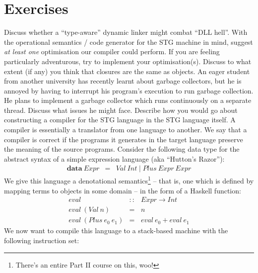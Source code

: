 \documentclass[10pt,a4paper]{exam} %
\begin{document}
\section*{Exercises}

\begin{questions}
\question Discuss whether a ``type-aware'' dynamic linker might combat ``DLL hell''.
\question With the operational semantics / code generator for the STG machine in mind, suggest \emph{at least one} optimisation our compiler could perform. If you are feeling particularly adventurous, try to implement your optimisation(s).
\question Discuss to what extent (if any) you think that closures are the same as objects. 
\question An eager student from another university has recently learnt about garbage collectors, but he is annoyed by having to interrupt his program's execution to run garbage collection. He plans to implement a garbage collector which runs continuously on a separate thread. Discuss what issues he might face.
\question Describe how you would go about constructing a compiler for the STG language in the STG language itself.
\question A compiler is essentially a translator from one language to another. We say that a compiler is correct if the programs it generates in the target language preserve the meaning of the source programs. Consider the following data type for the abstract syntax of a simple expression language (aka ``Hutton's Razor''):
\begin{displaymath}
\begin{array}{lcl}
\mathbf{data}~\mathit{Expr} & = & \mathit{Val}~\mathit{Int} \mid \mathit{Plus}~\mathit{Expr}~\mathit{Expr}
\end{array}
\end{displaymath}
We give this language a denotational semantics\footnote{There's an entire Part II course on this, woo!} -- that is, one which is defined by mapping terms to objects in some domain -- in the form of a Haskell function:
\begin{displaymath}
\begin{array}{lcl}
\mathit{eval} & :: & \mathit{Expr} \to \mathit{Int} \\
\mathit{eval}~(\mathit{Val}~n) & = & n \\
\mathit{eval}~(\mathit{Plus}~e_0~e_1) & = & \mathit{eval}~e_0 + \mathit{eval}~e_1
\end{array}
\end{displaymath}
We now want to compile this language to a stack-based machine with the following instruction set:
\begin{displaymath}

\end{displaymath}
\end{questions}
\end{document}
